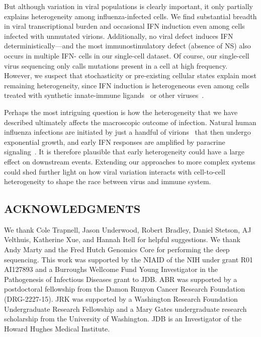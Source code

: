 \documentclass[10pt,letterpaper]{article}
\begin{document}
But although variation in viral populations is clearly important, it only partially explains heterogeneity among influenza-infected cells.
We find substantial breadth in viral transcriptional burden and occasional IFN induction even among cells infected with unmutated virions.
Additionally, no viral defect induces IFN deterministically---and the most immunostimulatory defect (absence of NS) also occurs in multiple IFN- cells in our single-cell dataset.
Of course, our single-cell virus sequencing only calls mutations present in a cell at high frequency.
However, we suspect that stochasticity or pre-existing cellular states explain most remaining heterogeneity, since IFN induction is heterogeneous even among cells treated with synthetic innate-immune ligands~\citep{shalek2013single, shalek2014single, wimmers2018single, bhushal2017cell} or other viruses~\citep{oneal2018west}.

Perhaps the most intriguing question is how the heterogeneity that we have described ultimately affects the macroscopic outcome of infection.
Natural human influenza infections are initiated by just a handful of virions~\citep{mccrone2018stochastic, xue2018reconciling, varble2014influenza} that then undergo exponential growth, and early IFN responses are amplified by paracrine signaling~\citep{stetson2006type,honda2006type}.
It is therefore plausible that early heterogeneity could have a large effect on downstream events.
Extending our approaches to more complex systems could shed further light on how viral variation interacts with cell-to-cell heterogeneity to shape the race between virus and immune system.

\small
\subsection*{ACKNOWLEDGMENTS}
We thank Cole Trapnell, Jason Underwood, Robert Bradley, Daniel Stetson, AJ Velthuis, Katherine Xue, and Hannah Itell for helpful suggestions.
We thank Andy Marty and the Fred Hutch Genomics Core for performing the deep sequencing.
This work was supported by the NIAID of the NIH under grant R01 AI127893 and a Burroughs Wellcome Fund Young Investigator in the Pathogenesis of Infectious Diseases grant to JDB.
ABR was supported by a postdoctoral fellowship from the Damon Runyon Cancer Research Foundation (DRG-2227-15).
JRK was supported by a Washington Research Foundation Undergraduate Research Fellowship and a Mary Gates undergraduate research scholarship from the University of Washington.
JDB is an Investigator of the Howard Hughes Medical Institute.
\end{document}
